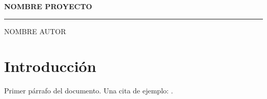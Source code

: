 \documentclass[a4paper,12pt]{article}
\newcommand{\Nombre}{NOMBRE AUTOR}
\newcommand{\Proyecto}{NOMBRE PROYECTO}
\begin{document}
\begin{titlepage}
    \begin{center}
        \huge\textbf{\Proyecto}
    \end{center}
    \hfill{}
    {\color{orangePortada}\hrule}
    \vfill{}
    \begin{center}
    \end{center}
    \vfill{}
    \begin{center}
        {\large \Nombre}
    \end{center}
\end{titlepage}

\clearpage
{}
\tableofcontents
\thispagestyle{empty}
\clearpage

\section{Introducción}

Primer párrafo del documento. Una cita de ejemplo: \cite{knuth1984}.

\printbibliography
\end{document}
